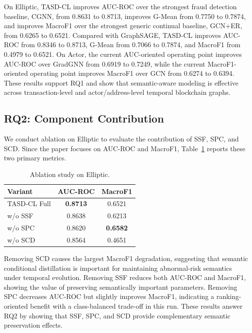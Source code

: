 On Elliptic, TASD-CL improves AUC-ROC over the strongest fraud detection baseline, CGNN, from 0.8631 to 0.8713, improves G-Mean from 0.7750 to 0.7874, and improves MacroF1 over the strongest generic continual baseline, GCN+ER, from 0.6265 to 0.6521. Compared with GraphSAGE, TASD-CL improves AUC-ROC from 0.8346 to 0.8713, G-Mean from 0.7066 to 0.7874, and MacroF1 from 0.4979 to 0.6521. On Actor, the current AUC-oriented operating point improves AUC-ROC over GradGNN from 0.6919 to 0.7249, while the current MacroF1-oriented operating point improves MacroF1 over GCN from 0.6274 to 0.6394. These results support RQ1 and show that semantic-aware modeling is effective across transaction-level and actor/address-level temporal blockchain graphs.

\subsection{RQ2: Component Contribution}
\label{subsec:component-contribution}

We conduct ablation on Elliptic to evaluate the contribution of SSF, SPC, and SCD. Since the paper focuses on AUC-ROC and MacroF1, Table~\ref{tab:ablation} reports these two primary metrics.

\begin{table}[!htbp]
  \centering
  \caption{Ablation study on Elliptic.}
  \label{tab:ablation}
  \scriptsize
  \setlength{\tabcolsep}{4pt}
  \begin{tabular*}{\columnwidth}{@{\extracolsep{\fill}}lcc@{}}
    \toprule
    Variant & AUC-ROC & MacroF1 \\
    \midrule
    TASD-CL Full & \textbf{0.8713} & 0.6521 \\
    w/o SSF & 0.8638 & 0.6213 \\
    w/o SPC & 0.8620 & \textbf{0.6582} \\
    w/o SCD & 0.8564 & 0.4651 \\
    \bottomrule
  \end{tabular*}
\end{table}
\FloatBarrier

Removing SCD causes the largest MacroF1 degradation, suggesting that semantic conditional distillation is important for maintaining abnormal-risk semantics under temporal evolution. Removing SSF reduces both AUC-ROC and MacroF1, showing the value of preserving semantically important parameters. Removing SPC decreases AUC-ROC but slightly improves MacroF1, indicating a ranking-oriented benefit with a class-balanced trade-off in this run. These results answer RQ2 by showing that SSF, SPC, and SCD provide complementary semantic preservation effects.

